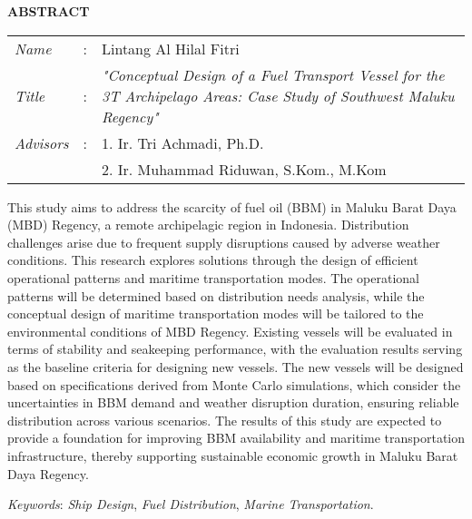 \begin{center}
  \large\textbf{ABSTRACT}
\end{center}

\vspace{2ex}

\begingroup
  \setlength{\tabcolsep}{0pt}
  \noindent
  \begin{tabularx}{\textwidth}{l >{\centering}m{2em} X}
    \emph{Name}     &:& Lintang Al Hilal Fitri \\
    \emph{Title}    &:&	\emph{"Conceptual Design of a Fuel Transport Vessel for the 3T Archipelago Areas: Case Study of Southwest Maluku Regency"} \\
    \emph{Advisors} &:& 1. Ir. Tri Achmadi, Ph.D.  \\
                    & & 2. Ir. Muhammad Riduwan, S.Kom., M.Kom \\
  \end{tabularx}
\endgroup


This study aims to address the scarcity of fuel oil (BBM) in Maluku Barat Daya (MBD) Regency, a remote archipelagic region in Indonesia. Distribution challenges arise due to frequent supply disruptions caused by adverse weather conditions. This research explores solutions through the design of efficient operational patterns and maritime transportation modes. The operational patterns will be determined based on distribution needs analysis, while the conceptual design of maritime transportation modes will be tailored to the environmental conditions of MBD Regency. Existing vessels will be evaluated in terms of stability and seakeeping performance, with the evaluation results serving as the baseline criteria for designing new vessels. The new vessels will be designed based on specifications derived from Monte Carlo simulations, which consider the uncertainties in BBM demand and weather disruption duration, ensuring reliable distribution across various scenarios. The results of this study are expected to provide a foundation for improving BBM availability and maritime transportation infrastructure, thereby supporting sustainable economic growth in Maluku Barat Daya Regency.


\emph{Keywords}: \emph{Ship Design}, \emph{Fuel Distribution}, \emph{Marine Transportation}.

